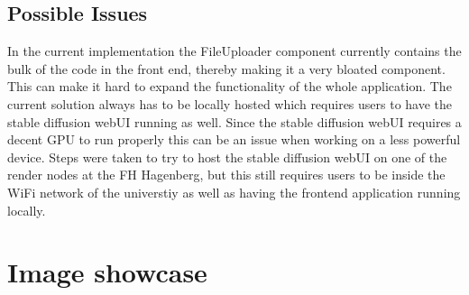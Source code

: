 \documentclass[english,notitlepage,smartquotes]{hgbreport}
\begin{document}
\section{Possible Issues}
In the current implementation the FileUploader component currently contains the bulk of the code in the front end, thereby making it a very bloated component. This can make it hard to expand the functionality of the whole application. 
The current solution always has to be locally hosted which requires users to have the stable diffusion webUI running as well. Since the stable diffusion webUI requires a decent GPU to run properly this can be an issue when working on a less powerful device. Steps were taken to try to host the stable diffusion webUI on one of the render nodes at the FH Hagenberg, but this still requires users to be inside the WiFi network of the universtiy as well as having the frontend application running locally.


\appendix                                                   %
\chapter{Image showcase}
\end{document}
